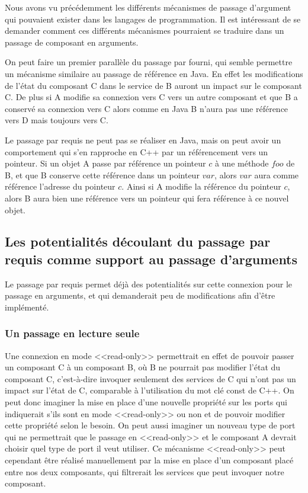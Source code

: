   Nous avons vu précédemment les différents mécanismes de passage d'argument qui pouvaient exister dans les langages de programmation. Il est intéressant de se demander comment ces différents mécanismes pourraient se traduire dans un passage de composant en arguments. 
   
  On peut faire un premier parallèle du passage par fourni, qui semble permettre un mécanisme similaire au passage de référence en Java. En effet les modifications de l'état du composant C dans le service de B auront un impact sur le composant C. De plus si A modifie sa connexion vers C vers un autre composant et que B a conservé sa connexion vers C alors comme en Java B n'aura pas une référence vers D mais toujours vers C.
  
  Le passage par requis ne peut pas se réaliser en Java, mais on peut avoir un comportement qui s'en rapproche en C++ par un référencement vers un pointeur. Si un objet A passe par référence un pointeur $c$ à une méthode $foo$ de B, et que B conserve cette référence dans un pointeur $var$, alors $var$ aura comme référence l'adresse du pointeur $c$. Ainsi si A modifie la référence du pointeur $c$, alors B aura bien une référence vers un pointeur qui fera référence à ce nouvel objet.
  
  \subsection{Les potentialités découlant du passage par requis comme support au passage d'arguments}

    Le passage par requis permet déjà des potentialités sur cette connexion pour le passage en arguments, et qui demanderait peu de modifications afin d'être implémenté. 
  
      \subsubsection{Un passage en lecture seule}
    
   Une connexion en mode <<read-only>> permettrait en effet de pouvoir passer un composant C à un composant B, où B ne pourrait pas modifier l'état du composant C, c'est-à-dire invoquer seulement des services de C qui n'ont pas un impact sur l'état de C, comparable à l'utilisation du mot clé const de C++. On peut donc imaginer la mise en place d'une nouvelle propriété sur les ports qui indiquerait s'ils sont en mode <<read-only>> ou non et de pouvoir modifier cette propriété selon le besoin. On peut aussi imaginer un nouveau type de port qui ne permettrait que le passage en <<read-only>> et le composant A devrait choisir quel type de port il veut utiliser. Ce mécanisme <<read-only>> peut cependant être réalisé manuellement par la mise en place d'un composant placé entre nos deux composants, qui filtrerait les services que peut invoquer notre composant.
  
